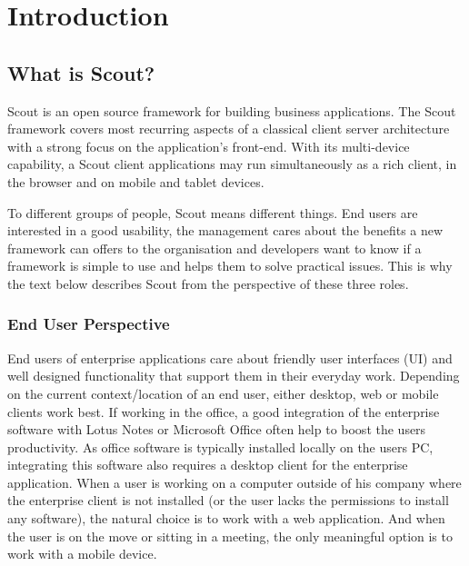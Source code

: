 \documentclass[a4paper,10pt,twoside]{book}
\begin{document}
  \sloppy
\fi


\chapter{Introduction}

\section{What is Scout?}

Scout is an open source framework for building business applications.
The Scout framework covers most recurring aspects of a classical client server architecture with a strong focus on the application's front-end. 
With its multi-device capability, a Scout client applications may run simultaneously as a rich client, in the browser and on mobile and tablet devices. 

To different groups of people, Scout means different things. 
End users are interested in a good usability, the management cares about the benefits a new framework can offers to the organisation and developers want to know if a framework is simple to use and helps them to solve practical issues. 
This is why the text below describes Scout from the perspective of these three roles.

\subsection{End User Perspective}

End users of enterprise applications care about friendly user interfaces (UI) and well designed functionality that support them in their everyday work. 
Depending on the current context/location of an end user, either desktop, web or mobile clients work best. 
If working in the office, a good integration of the enterprise software with Lotus Notes or Microsoft Office often help to boost the users productivity. 
As office software is typically installed locally on the users PC, integrating this software also requires a desktop client for the enterprise application. 
When a user is working on a computer outside of his company where the enterprise client is not installed (or the user lacks the permissions to install any software), the natural choice is to work with a web application.
And when the user is on the move or sitting in a meeting, the only meaningful option is to work with a mobile device. 
\end{document}
